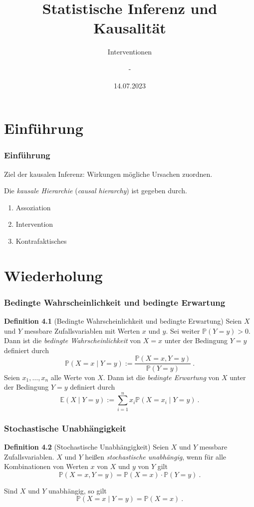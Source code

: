 \documentclass{beamer}
\title{Statistische Inferenz und Kausalität}
\subtitle{Interventionen}
\author{-}
\date{14.07.2023}
\newcommand{\en}[1]{{\scriptsize(\textit{#1})}}
\newcommand{\klein}[1]{{\scriptsize #1}}
\begin{document}
\frame{\titlepage}

\section{Einführung}
\begin{frame}
\frametitle{Einführung}

Ziel der kausalen Inferenz: Wirkungen mögliche Ursachen zuordnen.

\vspace*{\baselineskip}
\pause

Die \textit{kausale Hierarchie} \en{causal hierarchy} ist gegeben durch.
\begin{enumerate}[label=(\roman*)]
\item Assoziation
\item Intervention
\item Kontrafaktisches
\end{enumerate}
\end{frame}

\section{Wiederholung}
\begin{frame}
\frametitle{Bedingte Wahrscheinlichkeit und bedingte Erwartung}

\begin{block}{\textbf{Definition 4.1} \klein{(Bedingte Wahrscheinlichkeit und bedingte Erwartung)}}
Seien $X$ und $Y$ messbare Zufallsvariablen mit Werten $x$ und $y$. Sei weiter $\mathbb{P}(Y = y) > 0$. Dann ist die \textit{bedingte Wahrscheinlichkeit} von $X = x$ unter der Bedingung $Y = y$ definiert durch
\[\mathbb{P}(X = x \mid Y = y) := \frac{\mathbb{P}(X = x, Y = y)}{\mathbb{P}(Y = y)}~.\]
\pause
Seien $x_1, \dots, x_n$ alle Werte von $X$. Dann ist die \textit{bedingte Erwartung} von $X$ unter der Bedingung $Y = y$ definiert durch
\[\mathbb{E}(X \mid Y = y) := \sum_{i=1}^n x_i \mathbb{P}(X = x_i \mid Y = y)~.\]
\end{block}
\end{frame}

\begin{frame}
\frametitle{Stochastische Unabhängigkeit}

\begin{block}{\textbf{Definition 4.2} \klein{(Stochastische Unabhängigkeit)}}
Seien $X$ und $Y$ messbare Zufallsvariablen. $X$ und $Y$ heißen \textit{stochastische unabhängig}, wenn für alle Kombinationen von Werten $x$ von $X$ und $y$ von $Y$ gilt
\[\mathbb{P}(X = x, Y = y) = \mathbb{P}(X = x) \cdot \mathbb{P}(Y = y)~.\]
\end{block}

\pause

Sind $X$ und $Y$ unabhängig, so gilt
\[\mathbb{P}(X = x \mid Y = y) = \mathbb{P}(X = x)~.\]
\end{frame}
\end{document}
